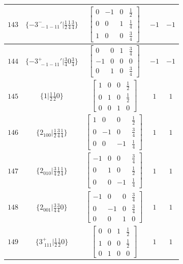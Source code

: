 \documentclass[fleqn,8pt]{jsarticle}
\begin{document}
\begin{longtable}{ccccc}
$ 143 $ & $ \{-3^{-}_{\,\,-1-11}{}'|\frac{1}{2} \frac{1}{4} \frac{3}{4}\} $ & $ \begin{bmatrix} 0 & -1 & 0 & \frac{1}{2} \\ 0 & 0 & 1 & \frac{1}{4} \\ 1 & 0 & 0 & \frac{3}{4} \end{bmatrix} $ & $ -1 $ & $ -1 $ \\ \hline
$ 144 $ & $ \{-3^{+}_{\,\,-1-11}{}'|\frac{3}{4} 0 \frac{3}{4}\} $ & $ \begin{bmatrix} 0 & 0 & 1 & \frac{3}{4} \\ -1 & 0 & 0 & 0 \\ 0 & 1 & 0 & \frac{3}{4} \end{bmatrix} $ & $ -1 $ & $ -1 $ \\ \hline
$ 145 $ & $ \{1|\frac{1}{2} \frac{1}{2} 0\} $ & $ \begin{bmatrix} 1 & 0 & 0 & \frac{1}{2} \\ 0 & 1 & 0 & \frac{1}{2} \\ 0 & 0 & 1 & 0 \end{bmatrix} $ & $ 1 $ & $ 1 $ \\ \hline
$ 146 $ & $ \{2{}_{100}|\frac{1}{2} \frac{3}{4} \frac{1}{4}\} $ & $ \begin{bmatrix} 1 & 0 & 0 & \frac{1}{2} \\ 0 & -1 & 0 & \frac{3}{4} \\ 0 & 0 & -1 & \frac{1}{4} \end{bmatrix} $ & $ 1 $ & $ 1 $ \\ \hline
$ 147 $ & $ \{2{}_{010}|\frac{3}{4} \frac{1}{2} \frac{1}{4}\} $ & $ \begin{bmatrix} -1 & 0 & 0 & \frac{3}{4} \\ 0 & 1 & 0 & \frac{1}{2} \\ 0 & 0 & -1 & \frac{1}{4} \end{bmatrix} $ & $ 1 $ & $ 1 $ \\ \hline
$ 148 $ & $ \{2{}_{001}|\frac{3}{4} \frac{3}{4} 0\} $ & $ \begin{bmatrix} -1 & 0 & 0 & \frac{3}{4} \\ 0 & -1 & 0 & \frac{3}{4} \\ 0 & 0 & 1 & 0 \end{bmatrix} $ & $ 1 $ & $ 1 $ \\ \hline
$ 149 $ & $ \{3^{+}_{\,\,111}|\frac{1}{2} \frac{1}{2} 0\} $ & $ \begin{bmatrix} 0 & 0 & 1 & \frac{1}{2} \\ 1 & 0 & 0 & \frac{1}{2} \\ 0 & 1 & 0 & 0 \end{bmatrix} $ & $ 1 $ & $ 1 $ \\ \hline

\end{longtable}
\end{document}
